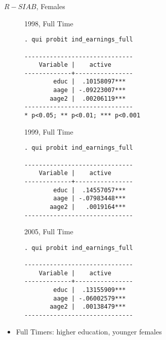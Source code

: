 \documentclass{beamer}
\begin{document}
\begin{frame}[fragile]{$R-SIAB$, Females}
\begin{figure}
\begin{minipage}[b]{0.3\textwidth}{1998, Full Time}
\begin{Verbatim}[fontsize=\tiny]
. qui probit ind_earnings_full

------------------------------
    Variable |    active      
-------------+----------------
        educ |  .10158097***  
        aage | -.09223007***  
       aage2 |  .00206119***    
------------------------------
* p<0.05; ** p<0.01; *** p<0.001
\end{Verbatim}
\end{minipage}
\begin{minipage}[b]{0.3\textwidth}{1999, Full Time}
\begin{Verbatim}[fontsize=\tiny]
. qui probit ind_earnings_full

------------------------------
    Variable |    active      
-------------+----------------
        educ |  .14557057***  
        aage | -.07983448***  
       aage2 |   .0019164*** 
------------------------------
\end{Verbatim}
\end{minipage}
\begin{minipage}[b]{0.3\textwidth}{2005, Full Time}
\begin{Verbatim}[fontsize=\tiny]
. qui probit ind_earnings_full

------------------------------
    Variable |    active      
-------------+----------------
        educ |  .13155909***  
        aage | -.06002579***  
       aage2 |  .00138479***   
------------------------------
\end{Verbatim}
\end{minipage}
\end{figure}
\begin{itemize}
\item Full Timers: higher education, younger females
\end{itemize}
\end{frame}
\end{document}
